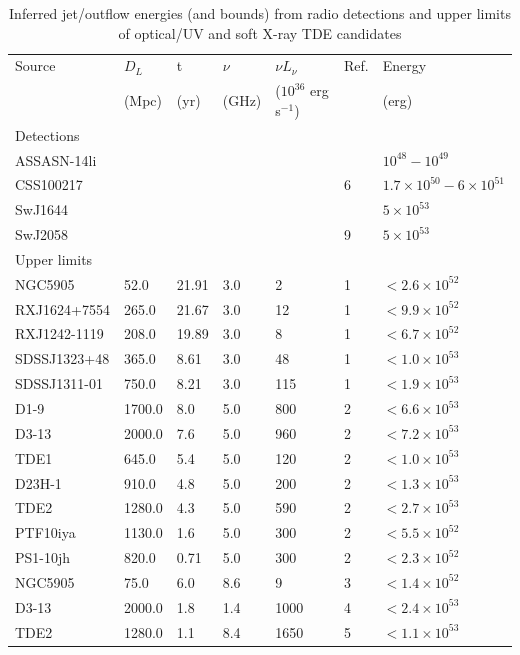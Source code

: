 \documentclass[usenatbib,fleqn]{mnras}
\begin{document}
\begin{table}
\begin{threeparttable}
  \caption{\label{tab:enConstr} Inferred jet/outflow energies (and
    bounds) from radio detections and upper limits of optical/UV and
    soft X-ray TDE candidates}
\begin{tabular*}{1.5\columnwidth}{lllllll}
\hline
Source & $D_L$ & t & $\nu$ & $\nu L_{\nu}$ & Ref. & Energy\\
& (Mpc) & (yr) & (GHz) & ($10^{36}$ erg s$^{-1}$) & & (erg) \\
\hline
Detections \\
\hline
ASSASN-14li & & & & & &  $10^{48}-10^{49}$\\
CSS100217 & & & & & 6 & $1.7\times 10^{50}-6\times 10^{51}$\\
SwJ1644 & & & & &   & $5\times 10^{53}$\\
SwJ2058 & & & & & 9  & $5\times 10^{53}$\\ 
\hline 
Upper limits & \\
\hline
NGC5905 & 52.0 & 21.91 & 3.0 & 2 & 1 & $< 2.6 \times 10^{ 52 }$ \\
RXJ1624+7554 & 265.0 & 21.67 & 3.0 & 12 & 1 & $< 9.9 \times 10^{ 52 }$ \\
RXJ1242-1119 & 208.0 & 19.89 & 3.0 & 8 & 1 & $< 6.7 \times 10^{ 52 }$ \\
SDSSJ1323+48 & 365.0 & 8.61 & 3.0 & 48 & 1 & $< 1.0 \times 10^{ 53 }$ \\
SDSSJ1311-01 & 750.0 & 8.21 & 3.0 & 115 & 1 & $< 1.9 \times 10^{ 53 }$ \\
D1-9 & 1700.0 & 8.0 & 5.0 & 800 & 2 & $< 6.6 \times 10^{ 53 }$ \\
D3-13 & 2000.0 & 7.6 & 5.0 & 960 & 2 & $< 7.2 \times 10^{ 53 }$ \\
TDE1 & 645.0 & 5.4 & 5.0 & 120 & 2 & $< 1.0 \times 10^{ 53 }$ \\
D23H-1 & 910.0 & 4.8 & 5.0 & 200 & 2 & $< 1.3 \times 10^{ 53 }$ \\
TDE2 & 1280.0 & 4.3 & 5.0 & 590 & 2 & $< 2.7 \times 10^{ 53 }$ \\
PTF10iya & 1130.0 & 1.6 & 5.0 & 300 & 2 & $< 5.5 \times 10^{ 52 }$ \\
PS1-10jh & 820.0 & 0.71 & 5.0 & 300 & 2 & $< 2.3 \times 10^{ 52 }$ \\
NGC5905 & 75.0 & 6.0 & 8.6 & 9 & 3 & $< 1.4 \times 10^{ 52 }$ \\
D3-13 & 2000.0 & 1.8 & 1.4 & 1000 & 4 & $< 2.4 \times 10^{ 53 }$ \\
TDE2 & 1280.0 & 1.1 & 8.4 & 1650 & 5 & $< 1.1 \times 10^{ 53 }$ \\

\end{tabular*}
\end{threeparttable}
\end{table}
\end{document}
